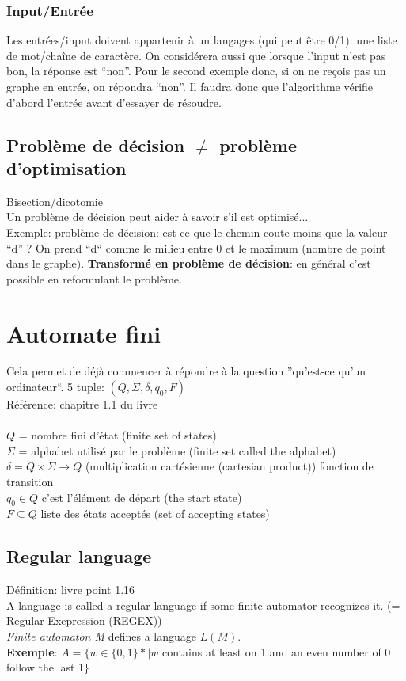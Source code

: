 \documentclass[a4paper,12pt]{article}
\begin{document}
    \subsubsection{Input/Entrée}
      Les entrées/input doivent appartenir à un langages (qui peut être 0/1): une liste de mot/chaîne de caractère.  On considérera aussi que lorsque l'input n'est pas bon, la réponse est ``non''.  Pour le second exemple donc, si on ne reçois pas un graphe en entrée, on répondra ``non''.   Il faudra donc que l'algorithme vérifie d'abord l'entrée avant d'essayer de résoudre.
    
  \subsection{Problème de décision $\neq$ problème d'optimisation}
    Bisection/dicotomie\\
    Un problème de décision peut aider à savoir s'il est optimisé...\\
    Exemple: problème de décision: est-ce que le chemin coute moins que la valeur ``d'' ?
    On prend ``d`` comme le milieu entre 0 et le maximum (nombre de point dans le graphe).
    \textbf{Transformé en problème de décision}: en général c'est possible en reformulant le problème.
    
\section{Automate fini}
  Cela permet de déjà commencer à répondre à la question ''qu'est-ce qu'un ordinateur``.
  5 tuple: $(Q, \Sigma, \delta, q_0, F)$\\
  Référence: chapitre 1.1 du livre\\
  \\
  $Q$ = nombre fini d'état (finite set of states).\\
  $\Sigma$ = alphabet utilisé par le problème (finite set called the alphabet)\\
  $\delta = Q \times \Sigma \rightarrow Q$ (multiplication cartésienne (cartesian product)) fonction de transition\\
  $q_0 \in Q$ c'est l'élément de départ (the start state)\\
  $F \subseteq Q$ liste des états acceptés (set of accepting states)\\
  
  \subsection{Regular language}
    Définition: livre point 1.16\\
    A language is called a regular language if some finite automator recognizes it. (= Regular Exepression (REGEX))\\
    \textit{Finite automaton M} defines a language $L(M)$.\\
    \textbf{Exemple}: $A = \{w \in \{0, 1\}* | w$ contains at least on 1 and an even number of 0 follow the last 1$\}$
    
\end{document}
